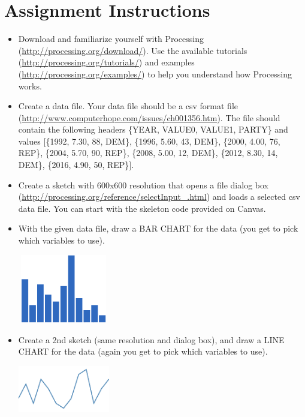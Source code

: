\documentclass[a4paper,12pt]{article}
\begin{document}
\section{Assignment Instructions}

\begin{itemize}

\item Download and familiarize yourself with Processing (\url{http://processing.org/download/}). Use the available tutorials (\url{http://processing.org/tutorials/}) and examples (\url{http://processing.org/examples/}) to help you understand how Processing works.

\item Create a data file. Your data file should be a csv format file (\url{http://www.computerhope.com/issues/ch001356.htm}). The file should contain the following headers \{YEAR, VALUE0, VALUE1, PARTY\} and values $\Big[$\{1992, 7.30, 88, DEM\}, \{1996, 5.60, 43, DEM\}, \{2000, 4.00, 76, REP\}, \{2004, 5.70, 90, REP\}, \{2008, 5.00, 12, DEM\}, \{2012, 8.30, 14, DEM\}, \{2016, 4.90, 50, REP\}$\Big]$.

\item Create a sketch with 600x600 resolution that opens a file dialog box (\url{http://processing.org/reference/selectInput_.html}) and loads a selected csv data file. You can start with the skeleton code provided on Canvas.

\item With the given data file, draw a BAR CHART for the data (you get to pick which variables to use).


\begin{center}
\includegraphics[width=4cm, height=3cm]{../images/barchart.png}
\end{center}

\item Create a 2nd sketch (same resolution and dialog box), and draw a LINE CHART for the data (again you get to pick which variables to use).


\begin{center}
\includegraphics[width=4cm]{../images/linechart.png}
\end{center}



\end{itemize}
\end{document}
